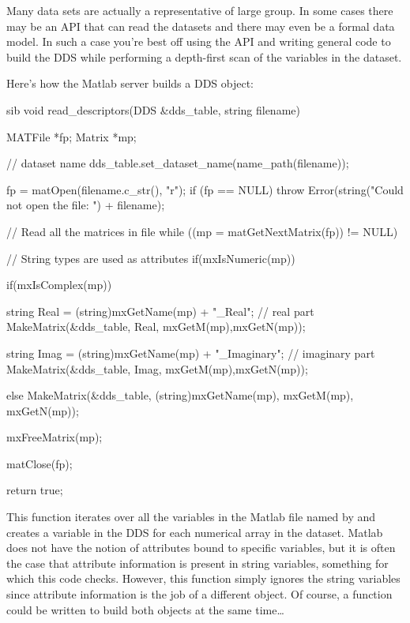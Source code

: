 \documentclass{dods-paper}
\begin{document}
Many data sets are actually a representative of large group. In some cases
there may be an API that can read the datasets and there may even be a
formal data model. In such a case you're best off using the API and
writing general code to build the DDS while performing a depth-first
scan of the variables in the dataset.
 

Here's how the Matlab server builds a DDS object:

\begin{vcode}{sib}
void
read_descriptors(DDS &dds_table, string filename)
{
    MATFile *fp;
    Matrix *mp;
      
    // dataset name
    dds_table.set_dataset_name(name_path(filename));
 
    fp = matOpen(filename.c_str(), "r");
    if (fp == NULL)
        throw Error(string("Could not open the file: ") + filename);

    // Read all the matrices in file
    while ((mp = matGetNextMatrix(fp)) != NULL) {

        // String types are used as attributes
        if(mxIsNumeric(mp)) {
            if(mxIsComplex(mp)) {
                string Real = (string)mxGetName(mp) + "_Real";
                // real part
                MakeMatrix(&dds_table, Real, mxGetM(mp),mxGetN(mp)); 

                string Imag = (string)mxGetName(mp) + "_Imaginary";
                // imaginary part
                MakeMatrix(&dds_table, Imag, mxGetM(mp),mxGetN(mp)); 
         } else
                MakeMatrix(&dds_table, (string)mxGetName(mp), mxGetM(mp),
                            mxGetN(mp)); 
         }

          mxFreeMatrix(mp);
    }
    matClose(fp);

    return true;
}
\end{vcode}

This function iterates over all the variables in the Matlab file named
by  and creates a variable in the DDS for each numerical
array in the dataset. Matlab does not have the notion of attributes
bound to specific variables, but it is often the case that attribute
information is present in string variables, something for which this code checks. However, this function simply ignores the string variables since
attribute information is the job of a different object. Of course, a
function could be written to build both objects at the same time\ldots
\end{document}
